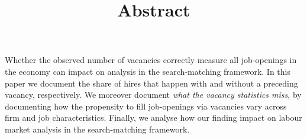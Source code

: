 \documentclass{article}
\title{Abstract}
\begin{document}
Whether the observed number of vacancies correctly measure all job-openings in the economy can impact on analysis in the search-matching framework. In this paper we document the share of hires that happen with and without a preceding vacancy, respectively. We moreover document \emph{what the vacancy statistics miss}, by documenting how the propensity to fill job-openings via vacancies vary across firm and job characteristics. Finally, we analyse how our finding impact on labour market analysis in the search-matching framework.
\end{document}
